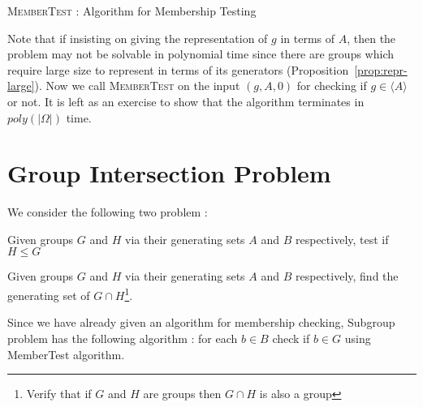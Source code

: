 \begin{algorithm}[htp!]
\caption{\textsc{MemberTest} : Algorithm for Membership Testing}
\label{alg:memtest}
\begin{algorithmic}[1]

\EndIf
{}
\Else
{}
\EndIf
\EndProcedure
\end{algorithmic}
\end{algorithm}

Note that if insisting on giving the representation of $g$ in terms of $A$,
then the problem may not be solvable in polynomial time since there are groups
which require large size to represent in terms of its generators
(Proposition~\ref{prop:repr-large}). Now we call \textsc{MemberTest} 
on the input $(g,A,0)$ for checking if $g \in \langle A \rangle$ or not. It is
left as an exercise to show that the algorithm terminates in $poly(|\Omega|)$
time.

\section{Group Intersection Problem}
We consider the following two problem :
\begin{problem}
	Given groups $G$ and $H$ via their generating sets $A$ and $B$ 
	respectively, test if $H \leq G$
\end{problem}
\begin{problem}
	Given groups $G$ and $H$ via their generating sets $A$ and $B$
	respectively, find the generating set of $G\cap H$\footnote{Verify
		that if $G$ and $H$ are groups then $G \cap H$ is also a
	group}.
\end{problem}

Since we have already given an algorithm for membership checking, Subgroup
problem has the following algorithm : for each $b\in B$ check if $b \in G$ 
using {\sc MemberTest} algorithm.

